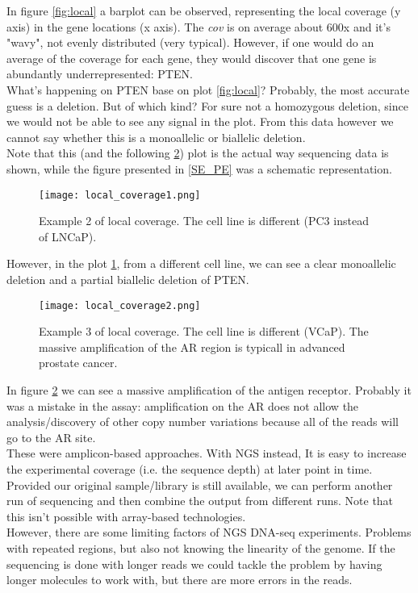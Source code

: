 In figure \ref{fig:local} a barplot can be observed, representing the local coverage (y axis) in the gene locations (x axis). The \textit{cov} is on average about 600x and it's "wavy", not evenly distributed (very typical). However, if one would do an average of the coverage for each gene, they would discover that one gene is abundantly underrepresented: PTEN.\\
What's happening on PTEN base on plot \ref{fig:local}? Probably, the most accurate guess is a deletion. But of which kind? For sure not a homozygous deletion, since we would not be able to see any signal in the plot. From this data however we cannot say whether this is a monoallelic or biallelic deletion. \\
Note that this (and the following \ref{fig:local2}) plot is the actual way sequencing data is shown, while the figure presented in \ref{SE_PE} was a schematic representation.

\begin{figure}[H]
    \centering
    \texttt{[image: local\_coverage1.png]}
    \caption{Example 2 of local coverage. The  cell line is different (PC3 instead of LNCaP). }
    \label{fig:local1}
\end{figure}

However, in the plot \ref{fig:local1}, from a different cell line, we can see a clear monoallelic deletion and a partial biallelic deletion of PTEN.\\

\begin{figure}[H]
    \centering
    \texttt{[image: local\_coverage2.png]}
    \caption{Example 3 of local coverage. The  cell line is different (VCaP). The massive amplification of the AR region is typicall in advanced prostate cancer.}
    \label{fig:local2}
\end{figure}

In figure \ref{fig:local2} we can see a massive amplification of the antigen receptor. Probably it was a mistake in the assay: amplification on the AR does not allow the analysis/discovery of other copy number variations because all of the reads will go to the AR site. \\
These were amplicon-based approaches.
With NGS instead, It is easy to increase the experimental coverage (i.e. the sequence depth) at later point in time.
Provided our original sample/library is still available, we can perform another run of sequencing and then combine the output from different runs.
Note that this isn’t possible with array-based technologies.\\
However, there are some limiting factors of NGS DNA-seq experiments.
Problems with repeated regions, but also not knowing the linearity of the genome.
If the sequencing is done with longer reads we could tackle the problem by having longer molecules to work with, but there are more errors in the reads.

